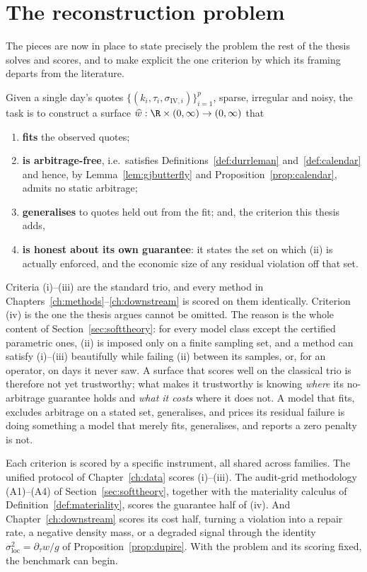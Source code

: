 \section{The reconstruction problem}\label{sec:problem}
The pieces are now in place to state precisely the problem the rest of the thesis solves and
scores, and to make explicit the one criterion by which its framing departs from the literature.

Given a single day's quotes $\{(k_i,\tau_i,\sigma_{\mathrm{IV},i})\}_{i=1}^{p}$, sparse,
irregular and noisy, the task is to construct a surface
$\widehat w:\R\times(0,\infty)\to(0,\infty)$ that

\begin{enumerate}[label=(\roman*)]
\item \textbf{fits} the observed quotes;
\item \textbf{is arbitrage-free}, i.e.\ satisfies Definitions~\ref{def:durrleman}
and~\ref{def:calendar} and hence, by Lemma~\ref{lem:gjbutterfly} and
Proposition~\ref{prop:calendar}, admits no static arbitrage;
\item \textbf{generalises} to quotes held out from the fit; and, the criterion this thesis adds,
\item \textbf{is honest about its own guarantee}: it states the set on which (ii) is actually
enforced, and the economic size of any residual violation off that set.
\end{enumerate}

Criteria (i)--(iii) are the standard trio, and every method in
Chapters~\ref{ch:methods}--\ref{ch:downstream} is scored on them identically. Criterion (iv) is
the one the thesis argues cannot be omitted. The reason is the whole content of
Section~\ref{sec:softtheory}: for every model class except the certified parametric ones, (ii)
is imposed only on a finite sampling set, and a method can satisfy (i)--(iii) beautifully while
failing (ii) between its samples, or, for an operator, on days it never saw. A surface that
scores well on the classical trio is therefore not yet trustworthy; what makes it trustworthy is
knowing \emph{where} its no-arbitrage guarantee holds and \emph{what it costs} where it does not.
A model that fits, excludes arbitrage on a stated set, generalises, and prices its residual
failure is doing something a model that merely fits, generalises, and reports a zero penalty is
not.

Each criterion is scored by a specific instrument, all shared across families. The unified
protocol of Chapter~\ref{ch:data} scores (i)--(iii). The audit-grid methodology (A1)--(A4) of
Section~\ref{sec:softtheory}, together with the materiality calculus of
Definition~\ref{def:materiality}, scores the guarantee half of (iv). And
Chapter~\ref{ch:downstream} scores its cost half, turning a violation into a repair rate, a
negative density mass, or a degraded signal through the identity
$\sigma_{\mathrm{loc}}^2=\partial_\tau w/g$ of Proposition~\ref{prop:dupire}. With the problem
and its scoring fixed, the benchmark can begin.
